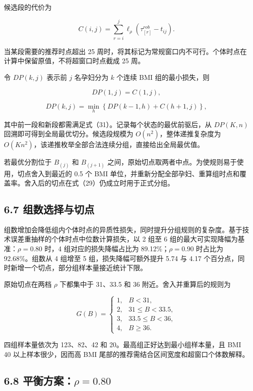 \documentclass[UTF8,fontset=fandol,zihao=-4,a4paper]{ctexart}
\begin{document}
候选段的代价为

\[
C(i,j)
=\sum_{r=i}^{j}
\ell_{\rho}
\left(\tau_{[r]}^{rob}-t_{ij}\right).
\tag{33}
\]

当某段需要的推荐时点超出 25
周时，将其标记为常规窗口内不可行。个体时点在计算中保留原值，不将超窗口时点截成
25 周。

令 \(DP(k,j)\) 表示前 \(j\) 名孕妇分为 \(k\) 个连续 BMI 组的最小损失，则

\[
DP(1,j)=C(1,j),
\tag{34}
\]

\[
DP(k,j)
=\min_{h}
\left\{
DP(k-1,h)+C(h+1,j)
\right\},
\tag{35}
\]

其中前一段和新段都需满足式（31）。记录每个状态的最优前驱后，从
\(DP(K,n)\) 回溯即可得到全局最优切分。候选段规模为
\(O(n^2)\)，整体递推复杂度为
\(O(Kn^2)\)，该递推枚举全部合法连续分组，直接给出全局最优值。

若最优分割位于 \(B_{(j)}\) 和 \(B_{(j+1)}\)
之间，原始切点取两者中点。为使规则易于使用，切点舍入到最近的 0.5 个 BMI
单位，并重新分配全部孕妇、重算组时点和覆盖率。舍入后的切点在式（29）仍成立时用于正式分组。

\subsection{6.7
组数选择与切点}\label{ux7ec4ux6570ux9009ux62e9ux4e0eux5207ux70b9}

组数增加会降低组内个体时点的异质性损失，同时提升分组规则的复杂度。基于技术误差重抽样的个体时点中位数计算损失，以
2 组至 6 组的最大可实现降幅为基准：\(\rho=0.80\) 时，4 组对应的损失降幅占比为
89.12\%；\(\rho=0.90\) 时占比为 92.68\%。组数从 4 组增至 5
组，损失降幅可额外提升 5.74 与 4.17
个百分点，同时新增一个切点，部分组样本量接近统计下限。

原始切点在两档 \(\rho\) 下都集中于 31、33.5 和 36
附近。舍入并重算后的规则为

\[
G(B)=
\begin{cases}
1, & B<31,\\
2, & 31\le B<33.5,\\
3, & 33.5\le B<36,\\
4, & B\ge36.
\end{cases}
\tag{36}
\]

四组样本量依次为 123、82、42 和 20。最高组正好达到最小组样本量，且 BMI
40 以上样本很少，因而高 BMI 尾部的推荐需结合区间宽度和超窗口个体数解释。

\subsection{\texorpdfstring{6.8
平衡方案：\(\rho=0.80\)}{6.8 平衡方案：\textbackslash rho=0.80}}\label{ux5e73ux8861ux65b9ux6848rho0.80}
\end{document}

